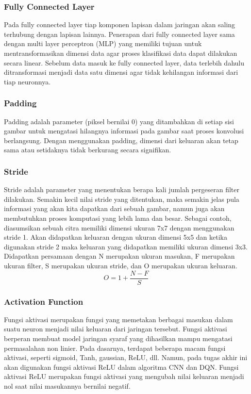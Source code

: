 \subsubsection{Fully Connected Layer}
Pada fully connected layer tiap komponen lapisan dalam jaringan akan saling terhubung dengan lapisan lainnya. Penerapan dari fully connected layer sama dengan multi layer perceptron (MLP) yang memiliki tujuan untuk mentransformasikan dimensi data agar proses klasifikasi data dapat dilakukan secara linear. Sebelum data masuk ke fully connected layer, data terlebih dahulu ditransformasi menjadi data satu dimensi agar tidak kehilangan informasi dari tiap neuronnya.

\subsubsection{Padding}
Padding adalah parameter (piksel bernilai 0) yang ditambahkan di setiap sisi gambar untuk mengatasi hilangnya informasi pada gambar saat proses konvolusi berlangsung. Dengan menggunakan padding, dimensi dari keluaran akan tetap sama atau setidaknya tidak berkurang secara signifikan. 

\subsubsection{Stride}
Stride adalah parameter yang menentukan berapa kali jumlah pergeseran filter dilakukan. Semakin kecil nilai stride yang ditentukan, maka semakin jelas pula informasi yang akan kita dapatkan dari sebuah gambar, namun juga akan membutuhkan proses komputasi yang lebih lama dan besar. Sebagai contoh, diasumsikan sebuah citra memiliki dimensi ukuran 7x7 dengan menggunakan stride 1. Akan didapatkan keluaran dengan ukuran dimensi 5x5 dan ketika digunakan stride 2 maka keluaran yang didapatkan memiliki ukuran dimensi 3x3. Didapatkan persamaan dengan N merupakan ukuran masukan, F merupakan ukuran filter, S merupakan ukuran stride, dan O merupakan ukuran keluaran.
\begin{equation}
	\label{eq:stride}
	O = 1 +\frac{N-F}{S}
\end{equation}

\subsubsection{Activation Function}
Fungsi aktivasi merupakan fungsi yang memetakan berbagai masukan dalam suatu neuron menjadi nilai keluaran dari jaringan tersebut. Fungsi aktivasi berperan membuat model jaringan syaraf yang dihasilkan mampu mengatasi permasalahan non linier. Pada dasarnya, terdapat beberapa macam fungsi aktivasi, seperti sigmoid, Tanh, gaussian, ReLU, dll. Namun, pada tugas akhir ini akan digunakan fungsi aktivasi ReLU dalam algoritma CNN dan DQN. Fungsi aktivasi ReLU merupakan fungsi aktivasi yang mengubah nilai keluaran menjadi nol saat nilai masukannya bernilai negatif.

